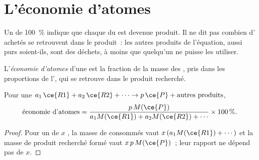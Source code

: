 \section{L'économie d'atomes}

Un  de \qty{100}{\percent} indique que chaque  du
 est devenue produit. Il ne dit pas combien d'
achetés se retrouvent dans le produit~: les autres produits de
l'équation, aussi purs soient-ils, sont des déchets, à moins que
quelqu'un ne puisse les utiliser.

\begin{definition}\label{def:g12:synthesis-strategy:atom-economy}
L'\emph{économie d'atomes} d'une  est
la fraction de la masse des , pris dans les proportions de
l', qui se retrouve dans le produit recherché.
\end{definition}

\begin{proposition}\label{prop:g12:synthesis-strategy:atom-economy}
Pour une  $a_1\,\ce{R1} + a_2\,\ce{R2} + \cdots \rightarrow
p\,\ce{P} + \text{autres produits}$,
\[
  \text{économie d'atomes} =
  \frac{p\,M(\ce{P})}{a_1 M(\ce{R1}) + a_2 M(\ce{R2}) + \cdots}
  \times 100\,\% .
\]
\end{proposition}

\begin{proof}
Pour un  de $x$ , la masse de  consommés vaut
$x\,(a_1 M(\ce{R1}) + \cdots)$ et la masse de produit recherché formé
vaut
$x\,p\,M(\ce{P})$~; leur rapport ne dépend pas de $x$.
\end{proof}

